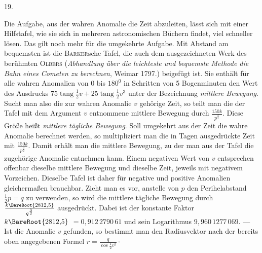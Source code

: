 \par{}
\begin{center}
\hypertarget{native-037-article019}{}19.
\end{center}
Die Aufgabe, aus der wahren Anomalie die Zeit abzuleiten, lässt sich mit einer Hilfstafel, wie sie sich in mehreren astronomischen Büchern findet, viel schneller lösen. Das gilt noch mehr für die umgekehrte Aufgabe. Mit Abstand am bequemsten ist die \textsc{Barker}sche Tafel, die auch dem ausgezeichneten Werk des berühmten \textsc{Olbers} (\emph{Abhandlung über die leichteste und bequemste Methode die Bahn eines Cometen zu berechnen}, Weimar 1797.) beigefügt ist. Sie enthält für alle wahren Anomalien von 0 bis $180^0$ in Schritten von 5 Bogenminuten den Wert des Ausdrucks $75\operatorname{tang}\frac{1}{2}v+25\operatorname{tang}\frac{1}{2}v^3$ unter der Bezeichnung \emph{mittlere Bewegung}. Sucht man also die zur wahren Anomalie $v$ gehörige Zeit, so teilt man die der Tafel mit dem Argument $v$ entnommene mittlere Bewegung durch $\frac{150k}{p^{\frac{3}{2}}}$. Diese Größe heißt \emph{mittlere tägliche Bewegung}. Soll umgekehrt aus der Zeit die wahre Anomalie berechnet werden, so multipliziert man die in Tagen ausgedrückte Zeit mit $\frac{150k}{p^{\frac{3}{2}}}$. Damit erhält man die mittlere Bewegung, zu der man aus der Tafel die zugehörige Anomalie entnehmen kann. Einem negativen Wert von $v$ entsprechen offenbar dieselbe mittlere Bewegung und dieselbe Zeit, jeweils mit negativem Vorzeichen. Dieselbe Tafel ist daher für negative und positive Anomalien gleichermaßen brauchbar. Zieht man es vor, anstelle von $p$ den Perihelabstand $\frac{1}{2}p=q$ zu verwenden, so wird die mittlere tägliche Bewegung durch $\frac{k\BareRoot{2812{,}5}}{q^{\frac{3}{2}}}$ ausgedrückt. Dabei ist der konstante Faktor $k\BareRoot{2812{,}5}$ $=0{,}912\,2790\,61$ und sein Logarithmus $9{,}960\,1277\,069$. — Ist die Anomalie $v$ gefunden, so bestimmt man den Radiusvektor nach der bereits oben angegebenen Formel $r=\frac{q}{\cos\frac{1}{2}v^2}\cdot$

